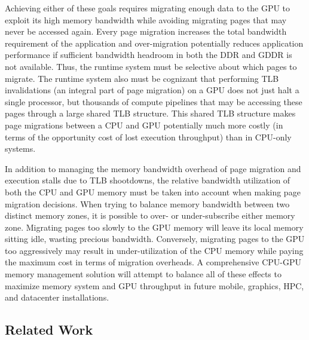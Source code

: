 Achieving either of these goals requires
migrating enough data to the GPU to exploit its high memory bandwidth while avoiding migrating pages
that may never be accessed again.  Every page migration increases the total bandwidth requirement of the
application and over-migration potentially reduces application performance if sufficient bandwidth headroom in both the DDR and GDDR is not available.
Thus, the runtime system must be selective about which pages to migrate.  The runtime system also must be cognizant
that performing TLB invalidations (an integral part of page migration) on a GPU does not just halt a single
processor, but thousands of compute pipelines that may be accessing these pages through a large shared TLB structure.
This shared TLB structure makes page migrations between a CPU and GPU potentially much more costly (in terms of the opportunity cost of lost execution throughput) than in CPU-only systems.

In addition to managing the memory bandwidth overhead
of page migration and execution stalls due to TLB shootdowns, the relative bandwidth utilization of both the CPU and GPU memory 
must be taken into account when making page migration decisions.  When trying to balance memory bandwidth between two distinct memory
zones, it is possible to over- or under-subscribe either memory zone. Migrating pages too slowly to the GPU
memory will leave its local memory sitting idle, wasting precious bandwidth.  Conversely, migrating pages
to the GPU too aggressively may result in under-utilization of the CPU memory while paying the maximum cost in terms
of migration overheads. A comprehensive CPU-GPU memory management solution will attempt to balance all of 
these effects to maximize memory system and GPU throughput in future mobile, graphics, HPC, and datacenter
installations.

\subsection{Related Work}
\label{related_work}
\vspace{-0.05in}

